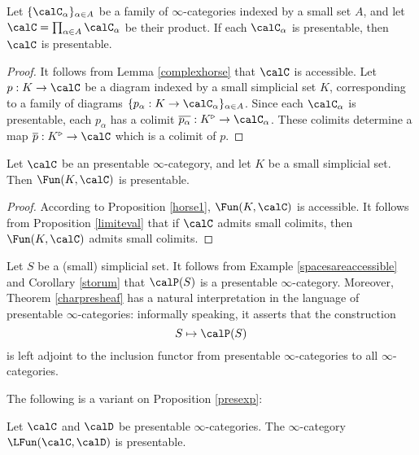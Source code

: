 \begin{proposition}\label{complexhorse2}
Let $\{ \calC_{\alpha} \}_{ \alpha \in A}$ be a family of $\infty$-categories indexed by a small
set $A$, and let $\calC = \prod_{\alpha \in A} \calC_{\alpha}$ be their product. If each
$\calC_{\alpha}$ is presentable, then $\calC$ is presentable.
\end{proposition}

\begin{proof}
It follows from Lemma \ref{complexhorse} that $\calC$ is accessible. Let $p: K \rightarrow \calC$ be a diagram indexed by a small simplicial set $K$, corresponding to a family of diagrams
$\{ p_{\alpha}: K \rightarrow \calC_{\alpha} \}_{\alpha \in A}$. Since each $\calC_{\alpha}$ is presentable, each $p_{\alpha}$ has a colimit $\overline{p_{\alpha}}: K^{\triangleright} \rightarrow \calC_{\alpha}$. These colimits determine a map $\overline{p}: K^{\triangleright} \rightarrow \calC$ which is a colimit of $p$.
\end{proof}

\begin{proposition}\label{presexp}
Let $\calC$ be an presentable $\infty$-category, and let $K$ be a small simplicial set. Then
$\Fun(K,\calC)$ is presentable.
\end{proposition}

\begin{proof}
According to Proposition \ref{horse1}, $\Fun(K,\calC)$ is accessible. It follows from Proposition \ref{limiteval} that if $\calC$ admits small colimits, then $\Fun(K,\calC)$ admits small colimits.
\end{proof}

\begin{remark}
Let $S$ be a (small) simplicial set.
It follows from Example \ref{spacesareaccessible} and Corollary \ref{storum} that $\calP(S)$
is a presentable $\infty$-category. Moreover, Theorem \ref{charpresheaf} has a natural interpretation in the language of presentable $\infty$-categories: informally speaking, it asserts that the construction $$ S \mapsto \calP(S)$$ is left adjoint to the inclusion functor from presentable $\infty$-categories to all $\infty$-categories.
\end{remark}

The following is a variant on Proposition \ref{presexp}:

\begin{proposition}\label{intmap}
Let $\calC$ and $\calD$ be presentable $\infty$-categories. The $\infty$-category
$\LFun(\calC, \calD)$ is presentable.
\end{proposition}

